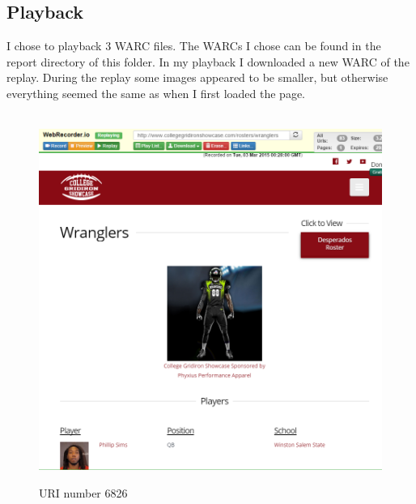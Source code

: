 \documentclass[12pt]{article}
\begin{document}
\subsection{Playback}
I chose to playback 3 WARC files.  The WARCs I chose can be found in the report directory of this folder.  In my playback I downloaded a new WARC of the replay.  During the replay some images appeared to be smaller, but otherwise everything seemed the same as when I first loaded the page.

\begin{figure}[H]
    \caption{URI number 6826}
    \centering
    \includegraphics[scale=0.5]{collegegridironreplay.PNG}
\end{figure}
\end{document}
